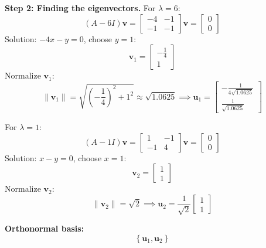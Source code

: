 \documentclass[12pt]{article}
\begin{document}
\textbf{Step 2: Finding the eigenvectors.}
For \(\lambda = 6\):
\[
(A - 6I)\mathbf{v} = \begin{bmatrix} -4 & -1 \\ -1 & -1 \end{bmatrix}\mathbf{v} = \begin{bmatrix} 0 \\ 0 \end{bmatrix}
\]
Solution: \( -4x - y = 0 \), choose \( y = 1 \):
\[
\mathbf{v}_1 = \begin{bmatrix} -\frac{1}{4} \\ 1 \end{bmatrix}
\]
Normalize \(\mathbf{v}_1\):
\[
\|\mathbf{v}_1\| = \sqrt{\left(-\frac{1}{4}\right)^2 + 1^2} \approx \sqrt{1.0625} \implies \mathbf{u}_1 = \begin{bmatrix} -\frac{1}{4\sqrt{1.0625}} \\ \frac{1}{\sqrt{1.0625}} \end{bmatrix}
\]

For \(\lambda = 1\):
\[
(A - 1I)\mathbf{v} = \begin{bmatrix} 1 & -1 \\ -1 & 4 \end{bmatrix}\mathbf{v} = \begin{bmatrix} 0 \\ 0 \end{bmatrix}
\]
Solution: \( x - y = 0 \), choose \( x = 1 \):
\[
\mathbf{v}_2 = \begin{bmatrix} 1 \\ 1 \end{bmatrix}
\]
Normalize \(\mathbf{v}_2\):
\[
\|\mathbf{v}_2\| = \sqrt{2} \implies \mathbf{u}_2 = \frac{1}{\sqrt{2}}\begin{bmatrix} 1 \\ 1 \end{bmatrix}
\]

\textbf{Orthonormal basis:}
\[
\left\{ \mathbf{u}_1, \mathbf{u}_2 \right\}
\]
\end{document}
